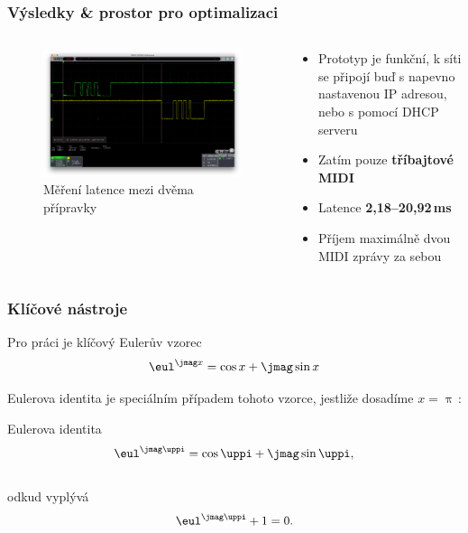 \documentclass[%
  12pt,       				%
	t,                  %
	aspectratio=1610,   %
	unicode,						%
]{beamer}				    	%
\begin{document}
\begin{frame}
	\frametitle{Výsledky \& prostor pro optimalizaci}
	\begin{columns}[T]
		\begin{column}{.6\textwidth}
			\begin{figure}
				\includegraphics[width=\linewidth]{obrazky/Mereni_1kanal.png}
				\caption{Měření latence mezi dvěma přípravky}
			\end{figure}
		\end{column}
		\begin{column}{.4\textwidth}
			\begin{itemize}
				\item Prototyp je funkční, k síti se připojí buď s napevno nastavenou IP adresou, nebo s pomocí DHCP serveru
				\item Zatím pouze \textbf{tříbajtové MIDI}
				\item Latence \textbf{2,18--20,92\,ms}
				\item Příjem maximálně dvou MIDI zprávy za sebou
			\end{itemize}
		\end{column}
	\end{columns}
	
\end{frame}
\begin{frame} 
	\frametitle{Klíčové nástroje}

	\begin{alertblock}{Pro práci je klíčový Eulerův vzorec}
		$$\eul^{\jmag x}=\cos x + \jmag\sin x$$
	\end{alertblock}

	\vspace{4ex}
	Eulerova identita je speciálním případem tohoto vzorce, jestliže dosadíme $x=\uppi$\,:

	\begin{block}{Eulerova identita}
		$$\eul^{\jmag \uppi}=\cos \uppi + \jmag\sin \uppi,$$\\
		odkud vyplývá
		$$\eul^{\jmag \uppi}+1=0.$$
	\end{block}
\end{frame} 
\end{document}
